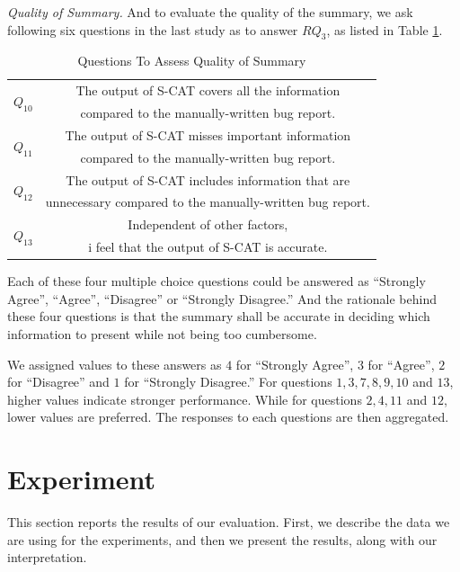 \documentclass[10pt,conference]{IEEEtran}
\begin{document}
\emph{Quality of Summary.} And to evaluate the quality of the summary, we ask following six questions in the last study as to answer $RQ_3$,
as listed in Table \ref{tab:quality}.


\begin{table}[!h]
\centering
\small
\caption{Questions To Assess Quality of Summary}
\begin{tabular}{c|c} \hline
  \multirow{2}{*}{$Q_{10}$} &The output of S-CAT covers all the information \\ & compared to the manually-written bug report.\\ \hline
  \multirow{2}{*}{$Q_{11}$} &The output of S-CAT misses important information \\ & compared to the manually-written bug report.\\ \hline
  \multirow{2}{*}{$Q_{12}$} &The output of S-CAT includes information that are \\ & unnecessary compared to the manually-written bug report.\\ \hline
  \multirow{2}{*}{$Q_{13}$} & Independent of other factors, \\ & i feel that the output of S-CAT is accurate.\\ \hline
\end{tabular}
\label{tab:quality}
\end{table}

Each of these four multiple choice questions could be answered as ``Strongly Agree'', ``Agree'', ``Disagree'' or ``Strongly Disagree.''
And the rationale behind these four questions is that the summary shall be accurate in deciding which information to present
while not being too cumbersome.

We assigned values to these answers as $4$ for ``Strongly Agree'', $3$ for ``Agree'', $2$ for ``Disagree'' and $1$ for ``Strongly Disagree.''
For questions $1,3,7,8,9,10$ and $13$, higher values indicate stronger performance. While for questions $2,4,11$ and $12$, lower values are preferred.
The responses to each questions are then aggregated.


\section{Experiment}\label{exp}

This section reports the results of our evaluation. First, we describe the data we are using for the experiments, and then we present
the results, along with our interpretation.
\end{document}
